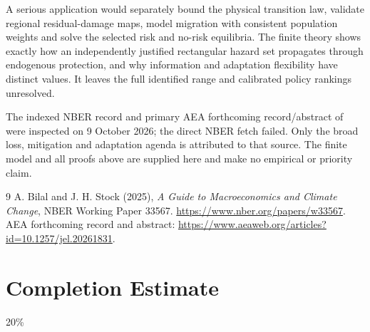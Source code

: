 \documentclass[11pt]{article}
\begin{document}
A serious application would separately bound the physical transition law,
validate regional residual-damage maps, model migration with consistent
population weights and solve the selected risk and no-risk equilibria.
The finite theory shows exactly how an independently justified rectangular
hazard set propagates through endogenous protection, and why information
and adaptation flexibility have distinct values. It leaves the full
identified range and calibrated policy rankings unresolved.

The indexed NBER record and primary AEA forthcoming record/abstract of
\cite{BS} were inspected on 9 October 2026; the direct NBER fetch failed.
Only the broad loss, mitigation and adaptation agenda is attributed to
that source. The finite model and all proofs above are supplied here and
make no empirical or priority claim.
\begin{thebibliography}{9}
 A. Bilal and J. H. Stock (2025),
\emph{A Guide to Macroeconomics and Climate Change}, NBER Working Paper
33567. \url{https://www.nber.org/papers/w33567}.
AEA forthcoming record and abstract:
\url{https://www.aeaweb.org/articles?id=10.1257/jel.20261831}.
\end{thebibliography}

\section{Completion Estimate}
20\%
\end{document}
